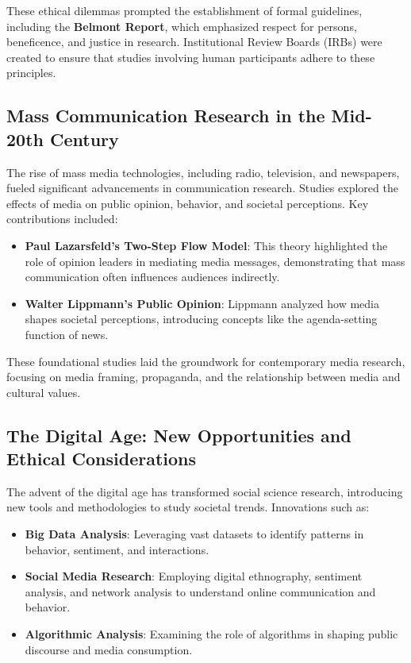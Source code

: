 \documentclass[
]{book}
\providecommand{\tightlist}{%
  \setlength{\itemsep}{0pt}\setlength{\parskip}{0pt}}
\begin{document}
These ethical dilemmas prompted the establishment of formal guidelines, including the \textbf{Belmont Report}, which emphasized respect for persons, beneficence, and justice in research. Institutional Review Boards (IRBs) were created to ensure that studies involving human participants adhere to these principles.

\subsection*{Mass Communication Research in the Mid-20th Century}\label{mass-communication-research-in-the-mid-20th-century}

The rise of mass media technologies, including radio, television, and newspapers, fueled significant advancements in communication research. Studies explored the effects of media on public opinion, behavior, and societal perceptions. Key contributions included:

\begin{itemize}
\tightlist
\item
  \textbf{Paul Lazarsfeld's Two-Step Flow Model}: This theory highlighted the role of opinion leaders in mediating media messages, demonstrating that mass communication often influences audiences indirectly.
\item
  \textbf{Walter Lippmann's Public Opinion}: Lippmann analyzed how media shapes societal perceptions, introducing concepts like the agenda-setting function of news.
\end{itemize}

These foundational studies laid the groundwork for contemporary media research, focusing on media framing, propaganda, and the relationship between media and cultural values.

\subsection*{The Digital Age: New Opportunities and Ethical Considerations}\label{the-digital-age-new-opportunities-and-ethical-considerations}

The advent of the digital age has transformed social science research, introducing new tools and methodologies to study societal trends. Innovations such as:

\begin{itemize}
\tightlist
\item
  \textbf{Big Data Analysis}: Leveraging vast datasets to identify patterns in behavior, sentiment, and interactions.
\item
  \textbf{Social Media Research}: Employing digital ethnography, sentiment analysis, and network analysis to understand online communication and behavior.
\item
  \textbf{Algorithmic Analysis}: Examining the role of algorithms in shaping public discourse and media consumption.
\end{itemize}
\end{document}
